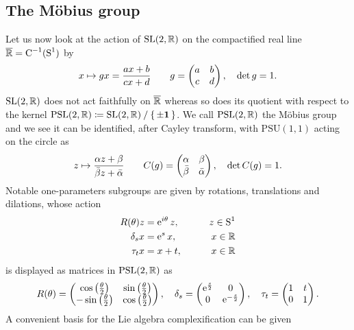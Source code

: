 \subsection{The M\"obius group}
\label{The Moebius group}
Let us now look at the action of $\textrm{SL}(2,\mathbb{R})$ on the 
compactified real line $\overline{\mathbb{R}}=\textrm{C}^{-1}(\textrm{S}^1)$ by 
\[
x\mapsto gx=\frac{ax+b}{cx+d}\qquad 
g=\begin{pmatrix}
  a&b\\
  c&d
  \end{pmatrix},
\quad \operatorname{det} g=1.
\]
$\textrm{SL}(2,\mathbb{R})$ does not act faithfully on $\overline{\mathbb{R}}$
whereas so does its quotient with respect to the kernel 
$\textrm{PSL}(2,\mathbb{R})\coloneqq \textrm{SL}(2,\mathbb{R})\mathbin/\set{\pm\bm{1}}$.
We call $\textrm{PSL}(2,\mathbb{R})$ the M\"obius group and we see it 
can be identified, after Cayley transform, with $\textrm{PSU}(1,1)$ 
acting on the circle as
\[
z\mapsto \frac{\alpha z +\beta}{\bar{\beta}z+\bar{\alpha}}
\qquad 
C(g)=\begin{pmatrix}
  \alpha&\beta\\
  \bar{\beta}&\bar{\alpha}
  \end{pmatrix},
\quad \operatorname{det} C(g)=1.
\]
Notable one-parameters subgroups are given by rotations, translations and 
dilations, whose action
\begin{align*}
R(\theta)z&=\operatorname{e}^{i\theta}z,\qquad &z\in\textrm{S}^1\\
\delta_s x&=\operatorname{e}^s x,\qquad &x\in\mathbb{R}\\
\tau_t x&=x+t,\qquad &x\in\mathbb{R}\\
\end{align*}
is displayed as matrices in $\textrm{PSL}(2,\mathbb{R})$ as
\[
R(\theta)=\begin{pmatrix}
          \cos\left(\frac{\theta}{2}\right)&\sin\left(\frac{\theta}{2}\right)\\
          -\sin\left(\frac{\theta}{2}\right)&\cos\left(\frac{\theta}{2}\right)
          \end{pmatrix},\quad
\delta_s=\begin{pmatrix}
          \operatorname{e}^{\frac{s}{2}}&0\\
          0&\operatorname{e}^{-\frac{s}{2}} 
          \end{pmatrix},\quad
\tau_t=  \begin{pmatrix}
          1&t\\
          0&1 
          \end{pmatrix}.
\]
A convenient basis for the Lie algebra complexification can be given
